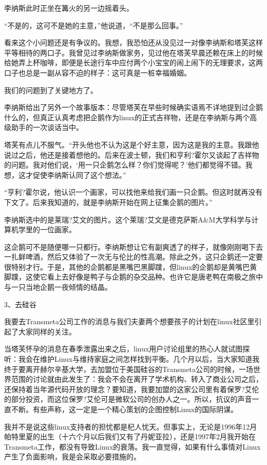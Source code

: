 李纳斯此时正坐在篝火的另一边摇着头。

“不是的，这可不是她的主意，”他说道，“不是那么回事。”

看来这个小问题还是有争议的。我想，我恐怕还从没见过一对像李纳斯和塔芙这样平等相待的两口子。我曾见过李纳斯做家务，见过他在塔芙早晨还赖在床上的时候给她弄上杯咖啡，即便是长途行车中应付两个小宝宝的闹上闹下的无理要求，这两口子也总是一副从容不迫的样子：这可真是一桩幸福婚姻。

我们的问题到了关键地方了。

李纳斯给出了另外一个故事版本：尽管塔芙在早些时候确实语焉不详地提到过企鹅什么的，但真正认真考虑把企鹅作为linux的正式吉祥物，还是在李纳斯与两个高级助手的一次谈话当中。

塔芙有点儿不服气。“开头他也不认为这是个好主意，因为这是我的主意。我跟他说过之后，他还是接着想他的。后来在波士顿，我们和亨利?霍尔又谈起了吉祥物的问题。我对他们说，‘用一只企鹅怎么样？你们觉得呢？’他们都觉得不错。我想，这才促使李纳斯认同了这个想法。”

“亨利?霍尔说，他认识一个画家，可以找他来给我们画一只企鹅。但这时就再没有下文了。后来我知道的，就是李纳斯开始在网上征集企鹅的图片。”

李纳斯选中的是莱瑞?艾文的图片。这个莱瑞?艾文是德克萨斯A\&M大学科学与计算机学里的一位画家。

这企鹅可不是随便哪一只都行。李纳斯想让它有副爽透了的样子，就像刚刚喝下去一扎鲜啤酒，然后又体验了一次无与伦比的性高潮。除此之外，这只企鹅还一定要很特别才行。于是，其他的企鹅都是黑嘴巴黑脚蹼，但linux的企鹅却是黄嘴巴黄脚蹼，这使它看上去好像是鸭子与企鹅的杂交品种。也许它是唐老鸭在南极之旅中与一只当地企鹅一夜倾情的结晶。

 
3、去硅谷

我要去Transmeta公司工作的消息与我们夫妻两个想要孩子的计划在linux社区里引起了大家同样的关注。

当塔芙怀孕的消息在春季泄露出来之后，linux用户讨论组里的热心人就试图探听：我会在维护Linux与维持家庭之间怎样找到平衡。几个月以后，当大家知道我终于要离开赫尔辛基大学，去加盟位于美国硅谷的Transmeta公司的时候，一场世界范围的讨论就由此发生了：我会不会在离开了学术机构、转入了商业公司之后，还保持着当年源代码开放的理念？要知道，我要加盟的这家公司里有着保罗?艾伦的部分投资，而这位保罗?艾伦可是微软公司的创办人之一。所以，抗议的声音一直不断。有些声称，这一定是一个精心策划的企图控制Linux的国际阴谋。

我并不是说这些linux支持者的担忧都是杞人忧天。但事实上，无论是1996年12月帕特里夏的出生（十六个月以后我们又有了丹妮亚拉），还是1997年2月我开始在Transmeta工作，都没有导致Linux的衰落。我一直觉得，如果有什么事情对Linux产生了负面影响，我是会采取必要措施的。

